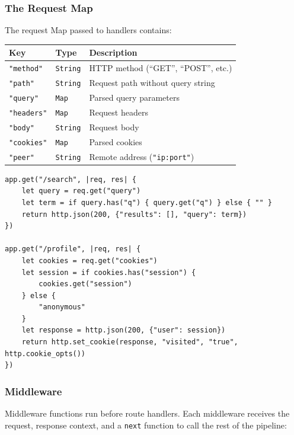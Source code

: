 \subsubsection{The Request Map}

The request Map passed to handlers contains:

\begin{center}
\begin{tabular}{llp{7cm}}
\toprule
\textbf{Key} & \textbf{Type} & \textbf{Description} \\
\midrule
\lstinline|"method"| & \lstinline|String| & HTTP method (``GET'', ``POST'', etc.) \\
\lstinline|"path"| & \lstinline|String| & Request path without query string \\
\lstinline|"query"| & \lstinline|Map| & Parsed query parameters \\
\lstinline|"headers"| & \lstinline|Map| & Request headers \\
\lstinline|"body"| & \lstinline|String| & Request body \\
\lstinline|"cookies"| & \lstinline|Map| & Parsed cookies \\
\lstinline|"peer"| & \lstinline|String| & Remote address (\texttt{"ip:port"}) \\
\bottomrule
\end{tabular}
\end{center}

\begin{lstlisting}[language=Lattice, caption={Working with query parameters and cookies}]
app.get("/search", |req, res| {
    let query = req.get("query")
    let term = if query.has("q") { query.get("q") } else { "" }
    return http.json(200, {"results": [], "query": term})
})

app.get("/profile", |req, res| {
    let cookies = req.get("cookies")
    let session = if cookies.has("session") {
        cookies.get("session")
    } else {
        "anonymous"
    }
    let response = http.json(200, {"user": session})
    return http.set_cookie(response, "visited", "true", http.cookie_opts())
})
\end{lstlisting}

\subsubsection{Middleware}

Middleware functions run before route handlers. Each middleware receives the
request, response context, and a \lstinline|next| function to call the rest
of the pipeline:

